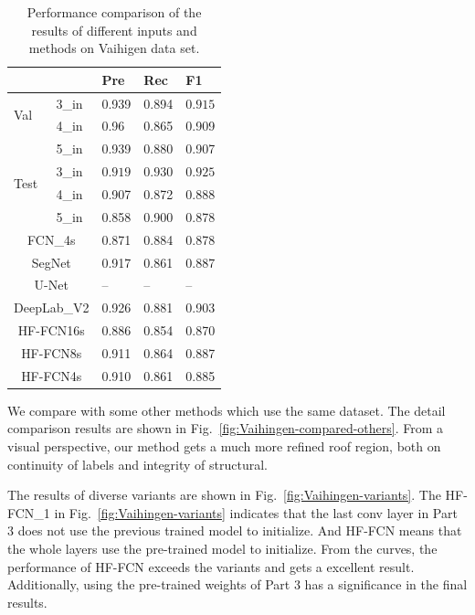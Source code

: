 

\begin{table}[htbp]
\caption {Performance comparison of the results of different inputs and methods on Vaihigen data set. }
\label{table:vaihigen-3-4-5in-comp}
\centering
\begin{tabular}{p{0.5cm}<{\centering}|p{1.1cm}<{\centering}|p{1.1cm}<{\centering}|p{1.1cm}<{\centering}|p{1.1cm}<{\centering}}
\hline
&&Pre&Rec&F1\\
\hline
\multirow{2}{*}{Val}&3\_in&0.939&0.894&$\bm{0.915}$\\
&4\_in&0.96&0.865&0.909\\
&5\_in&0.939&0.880&0.907\\
\hline
\multirow{2}{*}{Test}&3\_in&$\bm{0.919}$&$\bm{0.930}$&$\bm{0.925}$\\
&4\_in&0.907&0.872&0.888\\
&5\_in&0.858&0.900&0.878\\
\hline\hline
\multicolumn{2}{c|}{FCN\_4s\cite{IEEEexample:Long_2015_CVPR}}&{0.871}&{0.884}&{0.878}\\
\multicolumn{2}{c|}{SegNet\cite{IEEEexample:badrinarayanan2017segnet}}&{0.917}&{0.861}&{0.887}\\
\multicolumn{2}{c|}{U-Net\cite{IEEEexample:ronneberger2015u}}&{--}&{--}&{--}\\
\multicolumn{2}{c|}{DeepLab\_V2\cite{IEEEexample:chen2016deeplab}}&{0.926}&{0.881}&{0.903}\\
\hline \hline
\multicolumn{2}{c|}{HF-FCN16s}&{0.886}&{0.854}&{0.870}\\
\multicolumn{2}{c|}{HF-FCN8s}&{0.911}&{0.864}&{0.887}\\
\multicolumn{2}{c|}{HF-FCN4s}&{0.910}&{0.861}&{0.885}\\
\hline
\end{tabular}
\end{table}

We compare with some other methods which use the same dataset. The detail comparison results are shown in Fig.~\ref{fig:Vaihingen-compared-others}. From a visual perspective, our method gets a much more refined roof region, both on continuity of labels and integrity of structural.

The results of diverse variants are shown in Fig.~\ref{fig:Vaihingen-variants}. The HF-FCN\_1 in Fig.~\ref{fig:Vaihingen-variants} indicates that the last conv layer in Part 3 does not use the previous trained model to initialize. And HF-FCN means that the whole layers use the pre-trained model to initialize. From the curves, the performance of HF-FCN exceeds the variants and gets a excellent result. Additionally, using the pre-trained weights of Part 3 has a significance in the final results.

